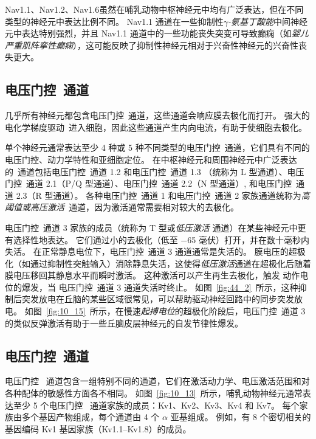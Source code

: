 Nav1.1、Nav1.2、Nav1.6虽然在哺乳动物中枢神经元中均有广泛表达，但在不同类型的神经元中表达比例不同。
Nav1.1 通道在一些抑制性\textit{$\gamma$-氨基丁酸能}中间神经元中表达特别强烈，并且 Nav1.1 通道中的一些功能丧失突变可导致癫痫（如\textit{婴儿严重肌阵挛性癫痫}），这可能反映了抑制性神经元相对于兴奋性神经元的兴奋性丧失更大。



\subsection{电压门控~通道}

几乎所有神经元都包含电压门控~通道，这些通道会响应膜去极化而打开。
强大的电化学梯度驱动~进入细胞，因此这些通道产生内向电流，有助于使细胞去极化。


单个神经元通常表达至少 4 种或 5 种不同类型的电压门控~通道，它们具有不同的电压门控、动力学特性和亚细胞定位。
在中枢神经元和周围神经元中广泛表达的~通道包括电压门控~通道 1.2 和电压门控~通道 1.3 （统称为 L 型通道）、电压门控~通道 2.1（P/Q 型通道）、电压门控~通道 2.2（N 型通道）, 和电压门控~通道 2.3（R 型通道）。
各种电压门控~通道 1 和电压门控~通道 2 家族通道统称为\textit{高阈值或高压激活}~通道，因为激活通常需要相对较大的去极化。


电压门控~通道 3 家族的成员（统称为 T 型或\textit{低压激活} 通道）在某些神经元中更有选择性地表达。
它们通过小的去极化（低至 −65 毫伏）打开，并在数十毫秒内失活。
在正常静息电位下，电压门控~通道 3 通道通常是失活的。
膜电压的超极化（如通过抑制性突触输入）消除静息失活，这使得\textit{低压激活}通道在超极化后随着膜电压移回其静息水平而瞬时激活。
这种激活可以产生再生去极化，触发  动作电位的爆发，当 电压门控~通道 3 通道失活时终止。 
如图~\ref{fig:44_2}~所示，这种抑制后突发放电在丘脑的某些区域很常见，可以帮助驱动神经回路中的同步突发放电。 
如图~\ref{fig:10_15}~所示，在慢速\textit{起搏电位}的超极化阶段后，电压门控~通道 3 的类似反弹激活有助于一些丘脑皮层神经元的自发节律性爆发。



\subsection{电压门控~通道}

电压门控~ 通道包含一组特别不同的通道，它们在激活动力学、电压激活范围和对各种配体的敏感性方面各不相同。
如图~\ref{fig:10_13}~所示，哺乳动物神经元通常表达至少 5 个电压门控~ 通道家族的成员：Kv1、Kv2、Kv3、Kv4 和 Kv7。
每个家族由多个基因产物组成，每个通道由 4 个 $\alpha$ 亚基组成。
例如，有 8 个密切相关的基因编码 Kv1 基因家族（Kv1.1–Kv1.8）的成员。


